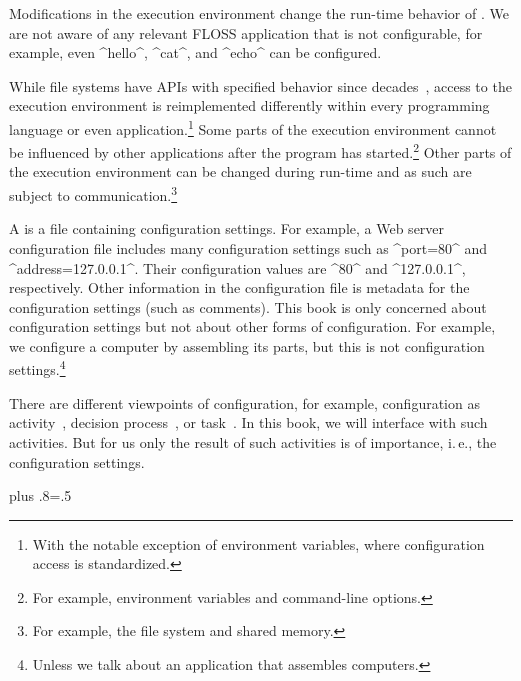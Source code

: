 Modifications in the execution environment change the run-time behavior of .
We are not aware of any relevant FLOSS application that is not configurable, for example, even ^hello^, ^cat^, and ^echo^ can be configured.

While file systems have APIs with specified behavior since decades~\cite{morgan1984specification,sandberg1985nfs}, access to the execution environment is reimplemented differently within every programming language or even application.\footnote{
With the notable exception of environment variables, where configuration access is standardized.}
Some parts of the execution environment cannot be influenced by other applications after the program has started.\footnote{For example, environment variables and command-line options.}
Other parts of the execution environment can be changed during run-time and as such are subject to  communication.\footnote{For example, the file system and shared memory.}



A  is a file containing configuration settings.
For example, a Web server configuration file includes many configuration settings such as ^port=80^ and ^address=127.0.0.1^.
Their configuration values are ^80^ and ^127.0.0.1^, respectively.
Other information in the configuration file is metadata for the configuration settings (such as comments).
This book is only concerned about configuration settings but not about other forms of configuration.
For example, we configure a computer by assembling its parts, but this is not configuration settings.\footnote{Unless we talk about an application that assembles computers.}

There are different viewpoints of configuration, for example, configuration as activity~\cite{sabin1998product}, decision process~\cite{reiser2009cvm}, or task~\cite{soininen1998towards}.
In this book, we will interface with such activities.
But for us only the result of such activities is of importance, i.\,e., the configuration settings.%
{\parfillskip=0pt plus .8\textwidth \emergencystretch=.5\textwidth \par}


